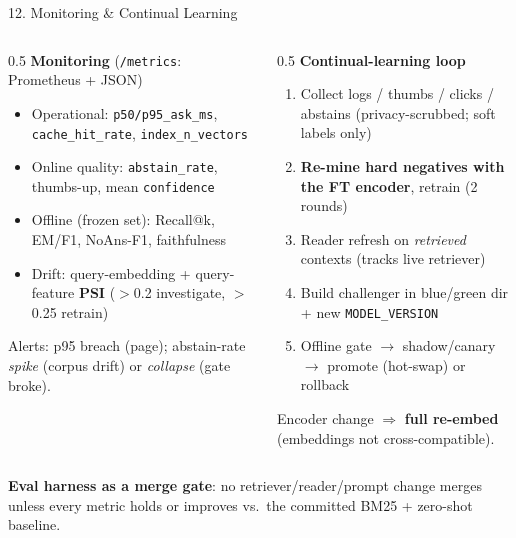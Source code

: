 \documentclass[10pt,aspectratio=169]{beamer}
\begin{document}
\begin{frame}{12. Monitoring \& Continual Learning}
\begin{columns}[T]
\begin{column}{0.5\textwidth}
\textbf{Monitoring} (\texttt{/metrics}: Prometheus + JSON)
\begin{itemize}\scriptsize
  \item Operational: \texttt{p50/p95\_ask\_ms}, \texttt{cache\_hit\_rate}, \texttt{index\_n\_vectors}
  \item Online quality: \texttt{abstain\_rate}, thumbs-up, mean \texttt{confidence}
  \item Offline (frozen set): Recall@k, EM/F1, NoAns-F1, faithfulness
  \item Drift: query-embedding + query-feature \textbf{PSI} ($>$0.2 investigate, $>$0.25 retrain)
\end{itemize}
\scriptsize Alerts: p95 breach (page); abstain-rate \emph{spike} (corpus drift) or \emph{collapse} (gate broke).
\end{column}
\begin{column}{0.5\textwidth}
\textbf{Continual-learning loop}
\begin{enumerate}\scriptsize
  \item Collect logs / thumbs / clicks / abstains (privacy-scrubbed; soft labels only)
  \item \textbf{Re-mine hard negatives with the FT encoder}, retrain (2 rounds)
  \item Reader refresh on \emph{retrieved} contexts (tracks live retriever)
  \item Build challenger in blue/green dir + new \texttt{MODEL\_VERSION}
  \item Offline gate $\rightarrow$ shadow/canary $\rightarrow$ promote (hot-swap) or rollback
\end{enumerate}
\scriptsize Encoder change $\Rightarrow$ \textbf{full re-embed} (embeddings not cross-compatible).
\end{column}
\end{columns}

\vspace{0.15cm}
\centering
\scriptsize \textbf{Eval harness as a merge gate}: no retriever/reader/prompt change merges unless every metric holds or improves vs.\ the committed BM25 + zero-shot baseline.
\end{frame}
\end{document}
